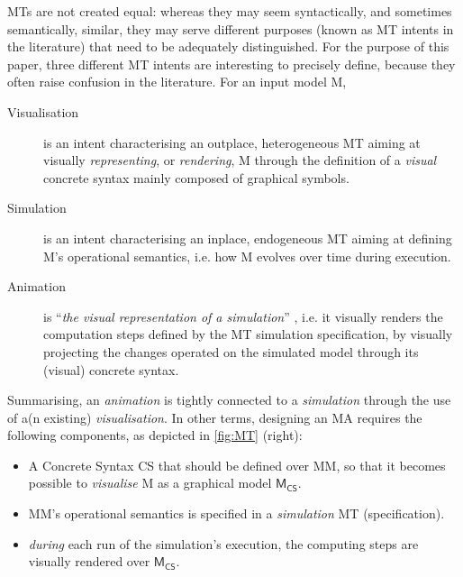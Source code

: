 MTs are not created equal: whereas they may seem syntactically, and sometimes 
semantically, similar, they may serve different purposes (known as MT intents
\citep{J:Lucio-Amrani-etAl:2014} in the literature) that need to be adequately
distinguished. For the purpose of this paper, three different MT intents are
interesting to precisely define, because they often raise confusion in the literature.
For an input model \textsf{M},
\begin{description}
   \item[Visualisation] is an intent characterising an outplace, heterogeneous
   MT aiming at visually \emph{representing}, or \emph{rendering}, \textsf{M} 
   through the definition of a \emph{visual} concrete syntax mainly composed of 
   graphical symbols.
   
   \item[Simulation] is an intent characterising an inplace, endogeneous MT aiming
   at defining \textsf{M}'s operational semantics, i.e. how \textsf{M} evolves 
   over time during execution.
   
   \item[Animation] is ``\emph{the visual representation of a simulation}'' 
   \citep{J:Lucio-Amrani-etAl:2014}, i.e. it visually renders the computation steps
   defined by the MT simulation specification, by visually projecting the changes
   operated on the simulated model through its (visual) concrete syntax.
\end{description}
Summarising, an \emph{animation} is tightly connected to a \emph{simulation} through
the use of a(n existing) \emph{visualisation}.
In other terms, designing an MA requires the following components, as depicted 
in \autoref{fig:MT} (right):
\begin{itemize}
	\item A Concrete Syntax \textsf{CS} that should be defined over \textsf{MM}, so
   that it becomes possible to \emph{visualise} \textsf{M} as a graphical model 
   $\mathsf{M}_{\mathsf{CS}}$.
   
   \item \textsf{MM}'s operational semantics is specified in a \emph{simulation}
   MT (specification).
   
   \item \emph{during} each run of the simulation's execution, the computing steps
   are visually rendered over $\mathsf{M}_{\mathsf{CS}}$.
\end{itemize}

